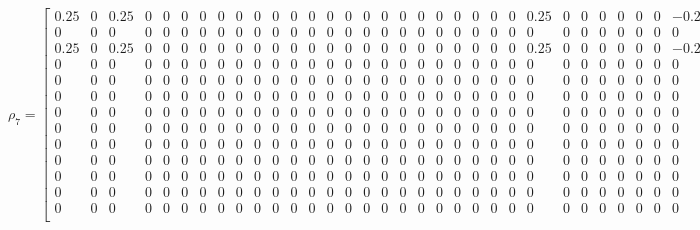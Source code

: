 \documentclass[10pt, a4paper]{article}
\begin{document}
\begin{sloppypar}
    \FloatBarrier
    \begin{figure}[h]
      \centering
      \setcounter{MaxMatrixCols}{33}
      \[
        \rho_{7}= \left[
        \begin{smallmatrix}
          0.25  & 0 & 0.25  & 0 & 0 & 0 & 0 & 0 & 0 & 0 & 0 & 0 & 0 & 0 & 0 & 0 & 0 & 0 & 0 & 0 & 0 & 0 & 0 & 0 & 0.25  & 0 & 0 & 0 & 0 & 0 & 0 & -0.25 \\
          0     & 0 & 0     & 0 & 0 & 0 & 0 & 0 & 0 & 0 & 0 & 0 & 0 & 0 & 0 & 0 & 0 & 0 & 0 & 0 & 0 & 0 & 0 & 0 & 0     & 0 & 0 & 0 & 0 & 0 & 0 & 0     \\
          0.25  & 0 & 0.25  & 0 & 0 & 0 & 0 & 0 & 0 & 0 & 0 & 0 & 0 & 0 & 0 & 0 & 0 & 0 & 0 & 0 & 0 & 0 & 0 & 0 & 0.25  & 0 & 0 & 0 & 0 & 0 & 0 & -0.25 \\
          0     & 0 & 0     & 0 & 0 & 0 & 0 & 0 & 0 & 0 & 0 & 0 & 0 & 0 & 0 & 0 & 0 & 0 & 0 & 0 & 0 & 0 & 0 & 0 & 0     & 0 & 0 & 0 & 0 & 0 & 0 & 0     \\
          0     & 0 & 0     & 0 & 0 & 0 & 0 & 0 & 0 & 0 & 0 & 0 & 0 & 0 & 0 & 0 & 0 & 0 & 0 & 0 & 0 & 0 & 0 & 0 & 0     & 0 & 0 & 0 & 0 & 0 & 0 & 0     \\
          0     & 0 & 0     & 0 & 0 & 0 & 0 & 0 & 0 & 0 & 0 & 0 & 0 & 0 & 0 & 0 & 0 & 0 & 0 & 0 & 0 & 0 & 0 & 0 & 0     & 0 & 0 & 0 & 0 & 0 & 0 & 0     \\
          0     & 0 & 0     & 0 & 0 & 0 & 0 & 0 & 0 & 0 & 0 & 0 & 0 & 0 & 0 & 0 & 0 & 0 & 0 & 0 & 0 & 0 & 0 & 0 & 0     & 0 & 0 & 0 & 0 & 0 & 0 & 0     \\
          0     & 0 & 0     & 0 & 0 & 0 & 0 & 0 & 0 & 0 & 0 & 0 & 0 & 0 & 0 & 0 & 0 & 0 & 0 & 0 & 0 & 0 & 0 & 0 & 0     & 0 & 0 & 0 & 0 & 0 & 0 & 0     \\
          0     & 0 & 0     & 0 & 0 & 0 & 0 & 0 & 0 & 0 & 0 & 0 & 0 & 0 & 0 & 0 & 0 & 0 & 0 & 0 & 0 & 0 & 0 & 0 & 0     & 0 & 0 & 0 & 0 & 0 & 0 & 0     \\
          0     & 0 & 0     & 0 & 0 & 0 & 0 & 0 & 0 & 0 & 0 & 0 & 0 & 0 & 0 & 0 & 0 & 0 & 0 & 0 & 0 & 0 & 0 & 0 & 0     & 0 & 0 & 0 & 0 & 0 & 0 & 0     \\
          0     & 0 & 0     & 0 & 0 & 0 & 0 & 0 & 0 & 0 & 0 & 0 & 0 & 0 & 0 & 0 & 0 & 0 & 0 & 0 & 0 & 0 & 0 & 0 & 0     & 0 & 0 & 0 & 0 & 0 & 0 & 0     \\
          0     & 0 & 0     & 0 & 0 & 0 & 0 & 0 & 0 & 0 & 0 & 0 & 0 & 0 & 0 & 0 & 0 & 0 & 0 & 0 & 0 & 0 & 0 & 0 & 0     & 0 & 0 & 0 & 0 & 0 & 0 & 0     \\
          0     & 0 & 0     & 0 & 0 & 0 & 0 & 0 & 0 & 0 & 0 & 0 & 0 & 0 & 0 & 0 & 0 & 0 & 0 & 0 & 0 & 0 & 0 & 0 & 0     & 0 & 0 & 0 & 0 & 0 & 0 & 0     \\

\end{smallmatrix}\]
\end{figure}
\end{sloppypar}
\end{document}
